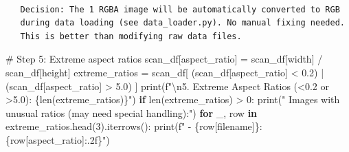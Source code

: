 \documentclass[
  letterpaper,
  DIV=11,
  numbers=noendperiod]{scrartcl}
\newenvironment{Shaded}{\begin{snugshade}}{\end{snugshade}}
\newcommand{\BuiltInTok}[1]{\textcolor[rgb]{0.00,0.23,0.31}{#1}}
\newcommand{\CharTok}[1]{\textcolor[rgb]{0.13,0.47,0.30}{#1}}
\newcommand{\CommentTok}[1]{\textcolor[rgb]{0.37,0.37,0.37}{#1}}
\newcommand{\ControlFlowTok}[1]{\textcolor[rgb]{0.00,0.23,0.31}{\textbf{#1}}}
\newcommand{\DecValTok}[1]{\textcolor[rgb]{0.68,0.00,0.00}{#1}}
\newcommand{\FloatTok}[1]{\textcolor[rgb]{0.68,0.00,0.00}{#1}}
\newcommand{\KeywordTok}[1]{\textcolor[rgb]{0.00,0.23,0.31}{\textbf{#1}}}
\newcommand{\NormalTok}[1]{\textcolor[rgb]{0.00,0.23,0.31}{#1}}
\newcommand{\OperatorTok}[1]{\textcolor[rgb]{0.37,0.37,0.37}{#1}}
\newcommand{\SpecialCharTok}[1]{\textcolor[rgb]{0.37,0.37,0.37}{#1}}
\newcommand{\SpecialStringTok}[1]{\textcolor[rgb]{0.13,0.47,0.30}{#1}}
\newcommand{\StringTok}[1]{\textcolor[rgb]{0.13,0.47,0.30}{#1}}
\renewenvironment{Shaded}{%
  \begin{tcolorbox}[%
    enhanced,%
    colback=codebg,%
    colframe=codebg,%
    borderline west={3pt}{0pt}{sectionblue},%
    boxrule=0pt,%
    arc=0pt,%
    boxsep=5pt,%
    left=2mm,%
    right=2mm,%
    top=2mm,%
    bottom=2mm%
  ]%
}{%
  \end{tcolorbox}%
}
\begin{document}
\begin{verbatim}

   Decision: The 1 RGBA image will be automatically converted to RGB
   during data loading (see data_loader.py). No manual fixing needed.
   This is better than modifying raw data files.
\end{verbatim}

\begin{Shaded}
\begin{Highlighting}[]
\CommentTok{\# Step 5: Extreme aspect ratios}
\NormalTok{scan\_df[}\StringTok{\textquotesingle{}aspect\_ratio\textquotesingle{}}\NormalTok{] }\OperatorTok{=}\NormalTok{ scan\_df[}\StringTok{\textquotesingle{}width\textquotesingle{}}\NormalTok{] }\OperatorTok{/}\NormalTok{ scan\_df[}\StringTok{\textquotesingle{}height\textquotesingle{}}\NormalTok{]}
\NormalTok{extreme\_ratios }\OperatorTok{=}\NormalTok{ scan\_df[}
\NormalTok{    (scan\_df[}\StringTok{\textquotesingle{}aspect\_ratio\textquotesingle{}}\NormalTok{] }\OperatorTok{\textless{}} \FloatTok{0.2}\NormalTok{) }\OperatorTok{|} 
\NormalTok{    (scan\_df[}\StringTok{\textquotesingle{}aspect\_ratio\textquotesingle{}}\NormalTok{] }\OperatorTok{\textgreater{}} \FloatTok{5.0}\NormalTok{)}
\NormalTok{]}
\BuiltInTok{print}\NormalTok{(}\SpecialStringTok{f"}\CharTok{\textbackslash{}n}\SpecialStringTok{5. Extreme Aspect Ratios (\textless{}0.2 or \textgreater{}5.0): }\SpecialCharTok{\{}\BuiltInTok{len}\NormalTok{(extreme\_ratios)}\SpecialCharTok{\}}\SpecialStringTok{"}\NormalTok{)}
\ControlFlowTok{if} \BuiltInTok{len}\NormalTok{(extreme\_ratios) }\OperatorTok{\textgreater{}} \DecValTok{0}\NormalTok{:}
    \BuiltInTok{print}\NormalTok{(}\StringTok{"   Images with unusual ratios (may need special handling):"}\NormalTok{)}
    \ControlFlowTok{for}\NormalTok{ \_, row }\KeywordTok{in}\NormalTok{ extreme\_ratios.head(}\DecValTok{3}\NormalTok{).iterrows():}
        \BuiltInTok{print}\NormalTok{(}\SpecialStringTok{f"     {-} }\SpecialCharTok{\{}\NormalTok{row[}\StringTok{\textquotesingle{}filename\textquotesingle{}}\NormalTok{]}\SpecialCharTok{\}}\SpecialStringTok{: }\SpecialCharTok{\{}\NormalTok{row[}\StringTok{\textquotesingle{}aspect\_ratio\textquotesingle{}}\NormalTok{]}\SpecialCharTok{:.2f\}}\SpecialStringTok{"}\NormalTok{)}


\end{Highlighting}
\end{Shaded}
\end{document}
